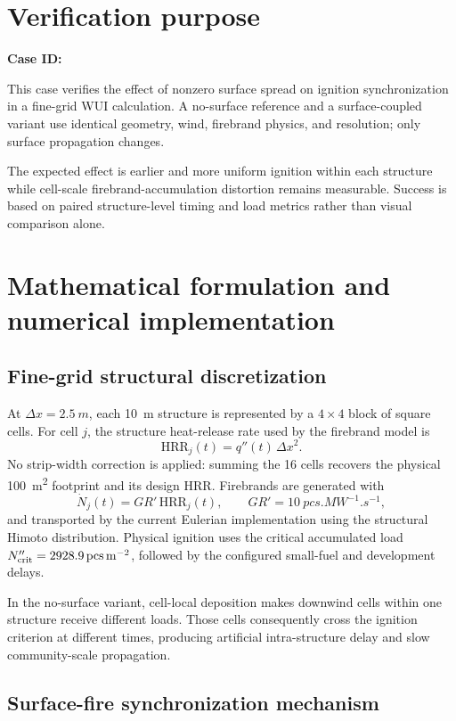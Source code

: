 \section{Verification purpose}

\textbf{Case ID:} \CaseID

This case verifies the effect of nonzero surface spread on ignition synchronization in a fine-grid WUI calculation. A no-surface reference and a surface-coupled variant use identical geometry, wind, firebrand physics, and resolution; only surface propagation changes.

The expected effect is earlier and more uniform ignition within each structure while cell-scale firebrand-accumulation distortion remains measurable. Success is based on paired structure-level timing and load metrics rather than visual comparison alone.

\section{Mathematical formulation and numerical implementation}

\subsection{Fine-grid structural discretization}

At \(\Delta x=\SI{2.5}{m}\), each \SI{10}{m} structure is represented by
a \(4\times4\) block of square cells. For cell \(j\), the
structure heat-release rate used by the firebrand model is
\[
  \mathrm{HRR}_j(t)=q''(t)\,\Delta x^2.
\]
No strip-width correction is applied: summing the 16 cells recovers the
physical \SI{100}{m^2} footprint and its design HRR. Firebrands are generated with
\[
  \dot N_j(t)=GR'\,\mathrm{HRR}_j(t),\qquad
  GR'=\SI{10}{pcs.MW^{-1}.s^{-1}},
\]
and transported by the current Eulerian implementation using the structural
Himoto distribution. Physical ignition uses the critical accumulated load
\(N''_{\rm crit}=\SI{2928.9}{pcs.m^{-2}}\), followed by the configured
small-fuel and development delays.

In the no-surface variant, cell-local deposition makes downwind cells within
one structure
receive different loads. Those cells consequently cross the ignition
criterion at different times, producing artificial intra-structure delay and
slow community-scale propagation.

\subsection{Surface-fire synchronization mechanism}

